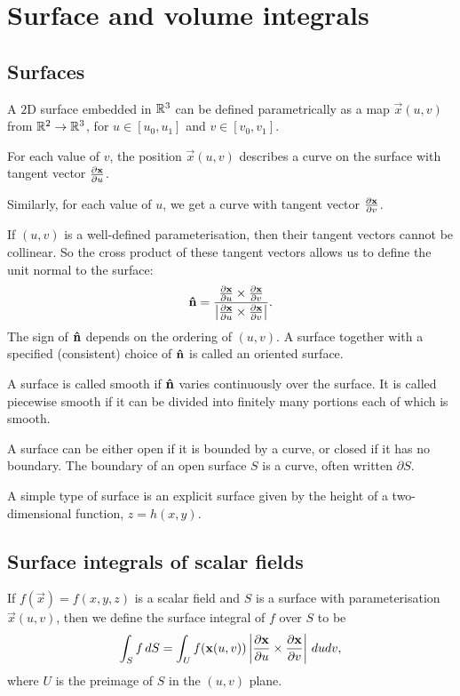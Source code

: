 \documentclass[10pt, a4paper]{article}
\begin{document}
\newpage

\section{Surface and volume integrals}

\subsection{Surfaces}

A $2$D surface embedded in $\R ^ 3$ can be defined parametrically as a map $\vec{x}(u, v)$ from $\R ^ 2 \to \R ^ 3$,
for $u \in [u_0, u_1]$ and $v \in [v_0, v_1]$.

For each value of $v$,
the position $\vec{x}(u, v)$ describes a curve on the surface with tangent vector $\pd[\vec{x}]{u}$.

Similarly,
for each value of $u$,
we get a curve with tangent vector $\pd[\vec{x}]{v}$.

If $(u, v)$ is a well-defined parameterisation,
then their tangent vectors cannot be collinear.
So the cross product of these tangent vectors allows us to define the unit normal to the surface:
\[
\hvec{n} = \frac{\pd[\vec{x}]{u} \times \pd[\vec{x}]{v}}{\left|\pd[\vec{x}]{u} \times \pd[\vec{x}]{v}\right|}.
\]
The sign of $\hvec{n}$ depends on the ordering of $(u, v)$.
A surface together with a specified
(consistent)
choice of $\hvec{n}$ is called an oriented surface.

A surface is called smooth if $\hvec{n}$ varies continuously over the surface.
It is called piecewise smooth if it can be divided into finitely many portions each of which is smooth.

A surface can be either open if it is bounded by a curve,
or closed if it has no boundary.
The boundary of an open surface $S$ is a curve,
often written $\partial S$.

A simple type of surface is an explicit surface given by the height of a two-dimensional function,
$z = h(x, y)$.

\subsection{Surface integrals of scalar fields}
If $f(\vec{x}) = f(x, y, z)$ is a scalar field and $S$ is a surface with parameterisation $\vec{x}(u, v)$,
then we define the surface integral of $f$ over $S$ to be
\[
\int_{S}f\,dS = \int_{U}f(\vec{x}(u, v))\left|\pd[\vec{x}]{u} \times \pd[\vec{x}]{v}\right|\,dudv,
\]
where $U$ is the preimage of $S$ in the $(u, v)$ plane.
\end{document}
